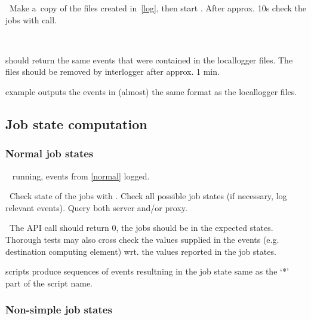 \what\ Make a~copy of the files created in~\ref{log}, then start
. After approx. 10s check the jobs
with  call.

\how\ 

\result {} should return the same events that were
contained in the locallogger files. The files should be removed by
interlogger after approx. 1 min.

\begin{hints}
 example outputs the events in (almost) the same
format as the locallogger files.
\end{hints}




\subsection{Job state computation}

\subsubsection{Normal job states}
\label{state}

\req\  running, events from \ref{normal} logged.

\what\ Check state of the jobs with . Check all possible job states 
(if necessary, log relevant events). Query both server and/or proxy.

\result\ The API call should return 0, the jobs should be in the expected
states. Thorough tests may also cross check the values supplied in the
events (e.g. destination computing element) wrt. the values reported in the job states.

\begin{hints}
 scripts produce sequences of events resultning
in the job state same as the `*' part of the script name.
\end{hints}



\subsubsection{Non-simple job states}



